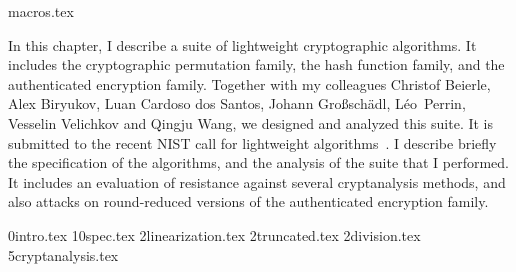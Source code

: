 \myminitoc

{macros.tex}

In this chapter, I describe a suite of lightweight cryptographic algorithms. It includes the \aCipher{} cryptographic permutation family, the \hash{} hash function family, and the \aead{} authenticated encryption family. Together with my colleagues Christof Beierle, Alex Biryukov, Luan Cardoso dos Santos, Johann Gro{\ss}sch{\"a}dl, L\'eo~Perrin, Vesselin Velichkov and Qingju Wang, we designed and analyzed this suite. It is submitted to the recent NIST call for lightweight algorithms~\cite{NISTlight}. I describe briefly the specification of the algorithms, and the analysis of the suite that I performed. It includes an evaluation of resistance against several cryptanalysis methods, and also attacks on round-reduced versions of the \aead{} authenticated encryption family.

{0intro.tex}
{10spec.tex}
{2linearization.tex}
{2truncated.tex}
{2division.tex}
{5cryptanalysis.tex}

